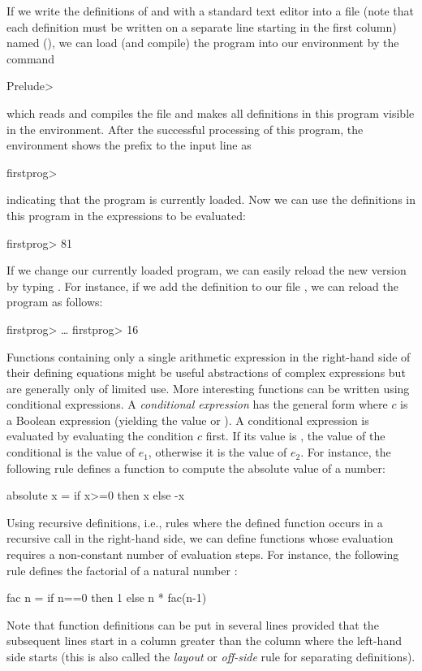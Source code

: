 If we write the definitions of  and 
with a standard text editor
into a file (note that each definition must be written on a separate
line starting in the first column) named 
(),
we can load (and compile) the program into our environment
by the command
\begin{prog}
Prelude> 
\end{prog}
which reads and compiles the file  and
makes all definitions in this program visible in the environment.
After the successful processing of this program, the environment
shows the prefix to the input line as
\begin{prog}
firstprog>
\end{prog}
indicating that the program  is currently loaded.
Now we can use the definitions in this program in the expressions
to be evaluated:
\begin{prog}
firstprog> 
81
\end{prog}
If we change our currently loaded program, we can easily reload
the new version by typing . For instance,
if we add the definition  to our file
, we can reload the program as follows:
\begin{prog}
firstprog> 
\ldots
firstprog> 
16
\end{prog}
Functions containing only a single arithmetic expression in the
right-hand side of their defining equations might be useful abstractions
of complex expressions but are generally only of limited use.
More interesting functions can be written using conditional
expressions. A \emph{conditional expression}%
has the general form 
where $c$ is a Boolean expression (yielding the value 
or ). A conditional expression is evaluated by
evaluating the condition $c$ first. If its value is ,
the value of the conditional is the value of $e_1$, otherwise
it is the value of $e_2$. For instance, the following rule
defines a function to compute the absolute value of a number:
\begin{prog}
absolute x = if x>=0 then x else -x
\end{prog}
Using recursive definitions, i.e., rules where the defined
function occurs in a recursive call in the right-hand side,
we can define functions whose evaluation requires a non-constant
number of evaluation steps. For instance, the following rule
defines the factorial of a natural number
:
\begin{prog}
fac n = if n==0 then 1
                else n * fac(n-1)
\end{prog}
Note that function definitions can be put in several lines
provided that the subsequent lines start in a column greater
than the column where the left-hand side starts
(this is also called the \emph{layout}
or \emph{off-side} rule for separating
definitions).

